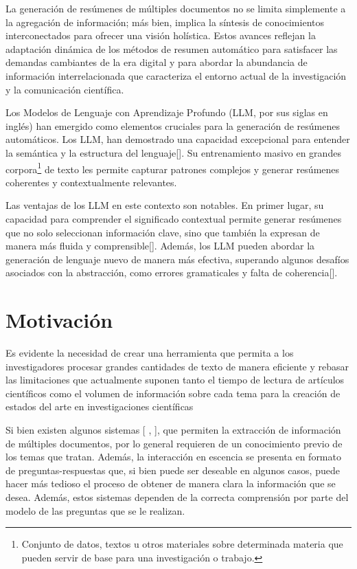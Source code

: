     La generación de resúmenes de múltiples documentos no se limita simplemente a la agregación de información; más bien, implica la síntesis de conocimientos interconectados para ofrecer una visión holística. 
    Estos avances reflejan la adaptación dinámica de los métodos de resumen automático para satisfacer las demandas cambiantes de la era digital y para abordar la abundancia de información interrelacionada que caracteriza el entorno actual de la investigación y la comunicación científica.

    Los Modelos de Lenguaje con Aprendizaje Profundo (LLM, por sus siglas en inglés) han emergido como elementos cruciales para la generación de resúmenes automáticos. Los LLM, han demostrado una capacidad excepcional para entender la semántica y la estructura del lenguaje[\cite{fewshot}]. Su entrenamiento masivo en grandes corpora\footnote{Conjunto de datos, textos u otros materiales sobre determinada materia que pueden servir de base para una investigación o trabajo.} de texto les permite capturar patrones complejos y generar resúmenes coherentes y contextualmente relevantes.

    Las ventajas de los LLM en este contexto son notables. En primer lugar, su capacidad para comprender el significado contextual permite generar resúmenes que no solo seleccionan información clave, sino que también la expresan de manera más fluida y comprensible[\cite{Radford2018ImprovingLU}]. Además, los LLM pueden abordar la generación de lenguaje nuevo de manera más efectiva, superando algunos desafíos asociados con la abstracción, como errores gramaticales y falta de coherencia[\cite{RoBERTa}].

\section{Motivación}
    Es evidente la necesidad de crear una herramienta que permita a los investigadores procesar grandes cantidades de texto de manera eficiente y rebasar las limitaciones que actualmente suponen tanto el tiempo de lectura de artículos científicos como el volumen de información sobre cada tema para la creación de estados del arte en investigaciones científicas

    Si bien existen algunos sistemas [\cite{elicit} , \cite{scite}], que permiten la extracción de información de múltiples documentos, por lo general requieren de un conocimiento previo de los temas que tratan. Además, la interacción en escencia se presenta en formato de preguntas-respuestas que, si bien puede ser deseable en algunos casos, puede hacer más tedioso el proceso de obtener de manera clara la información que se desea. Además, estos sistemas dependen de la correcta comprensión por parte del modelo de las preguntas que se le realizan.

